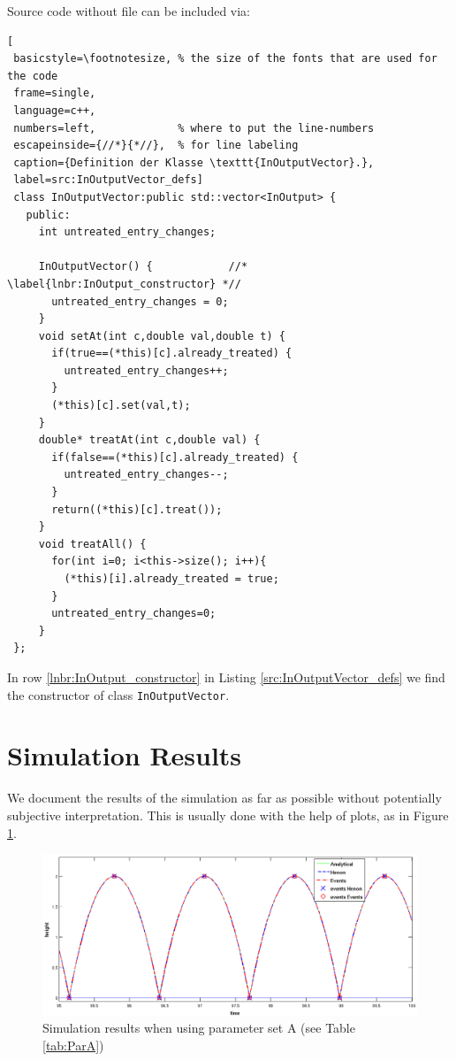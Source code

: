 \documentclass[a4paper,11pt]{scrartcl}
\begin{document}
Source code without file can be included via:
\begin{lstlisting}[
 basicstyle=\footnotesize, % the size of the fonts that are used for the code
 frame=single,          
 language=c++,
 numbers=left,             % where to put the line-numbers
 escapeinside={//*}{*//},  % for line labeling
 caption={Definition der Klasse \texttt{InOutputVector}.},
 label=src:InOutputVector_defs]  
 class InOutputVector:public std::vector<InOutput> {
   public:
     int untreated_entry_changes;
     
     InOutputVector() {            //* \label{lnbr:InOutput_constructor} *//
       untreated_entry_changes = 0;
     }    
     void setAt(int c,double val,double t) {
       if(true==(*this)[c].already_treated) {
         untreated_entry_changes++;
       } 
       (*this)[c].set(val,t);
     }
     double* treatAt(int c,double val) {
       if(false==(*this)[c].already_treated) {
         untreated_entry_changes--;
       }
       return((*this)[c].treat());
     }
     void treatAll() {
       for(int i=0; i<this->size(); i++){
         (*this)[i].already_treated = true;
       }
       untreated_entry_changes=0;
     }
 };
\end{lstlisting}    

In row \ref{lnbr:InOutput_constructor} in Listing \ref{src:InOutputVector_defs} we find the constructor of class
\verb|InOutputVector|.

\section{Simulation Results}
We document the results of the simulation as far as possible without potentially subjective interpretation. This is usually done with the help of plots, as in Figure \ref{fig:figure2}.
\begin{figure}[!ht]
 \centering
 \includegraphics[width=\textwidth]{./images/bBheightode23last5Sec.png}
 \caption{Simulation results when using parameter set A (see Table \ref{tab:ParA})}
 \label{fig:figure2}
\end{figure}
\end{document}
